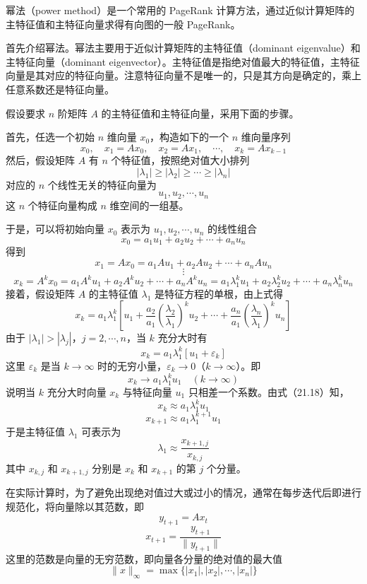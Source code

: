 \documentclass[UTF8,12pt,a4paper,fontset=fandol]{ctexart}
\begin{document}
幂法（power method）是一个常用的 PageRank 计算方法，通过近似计算矩阵的主特征值和主特征向量求得有向图的一般 PageRank。

首先介绍幂法。幂法主要用于近似计算矩阵的主特征值（dominant eigenvalue）和主特征向量（dominant eigenvector）。主特征值是指绝对值最大的特征值，主特征向量是其对应的特征向量。注意特征向量不是唯一的，只是其方向是确定的，乘上任意系数还是特征向量。

假设要求 $n$ 阶矩阵 $A$ 的主特征值和主特征向量，采用下面的步骤。

首先，任选一个初始 $n$ 维向量 $x_0$，构造如下的一个 $n$ 维向量序列
\[
x_0,\quad x_1=Ax_0,\quad x_2=Ax_1,\quad \cdots,\quad x_k=Ax_{k-1}
\]
然后，假设矩阵 $A$ 有 $n$ 个特征值，按照绝对值大小排列
\[
|\lambda_1|\geqslant |\lambda_2|\geqslant \cdots \geqslant |\lambda_n|
\]
对应的 $n$ 个线性无关的特征向量为
\[
u_1,u_2,\cdots,u_n
\]
这 $n$ 个特征向量构成 $n$ 维空间的一组基。

于是，可以将初始向量 $x_0$ 表示为 $u_1,u_2,\cdots,u_n$ 的线性组合
\[
x_0=a_1u_1+a_2u_2+\cdots+a_nu_n
\]
得到
\[
x_1=Ax_0=a_1Au_1+a_2Au_2+\cdots+a_nAu_n
\]
\[
\vdots
\]
\[
x_k=A^kx_0=a_1A^ku_1+a_2A^ku_2+\cdots+a_nA^ku_n
=a_1\lambda_1^ku_1+a_2\lambda_2^ku_2+\cdots+a_n\lambda_n^ku_n
\]
接着，假设矩阵 $A$ 的主特征值 $\lambda_1$ 是特征方程的单根，由上式得
\begin{equation}
x_k=a_1\lambda_1^k\left[u_1+\frac{a_2}{a_1}\left(\frac{\lambda_2}{\lambda_1}\right)^ku_2+\cdots+\frac{a_n}{a_1}\left(\frac{\lambda_n}{\lambda_1}\right)^ku_n\right]
\tag{21.16}
\end{equation}
由于 $|\lambda_1|>|\lambda_j|$，$j=2,\cdots,n$，当 $k$ 充分大时有
\begin{equation}
x_k=a_1\lambda_1^k[u_1+\varepsilon_k]
\tag{21.17}
\end{equation}
这里 $\varepsilon_k$ 是当 $k\to\infty$ 时的无穷小量，$\varepsilon_k\to 0$（$k\to\infty$）。即
\begin{equation}
x_k\to a_1\lambda_1^ku_1\quad (k\to\infty)
\tag{21.18}
\end{equation}
说明当 $k$ 充分大时向量 $x_k$ 与特征向量 $u_1$ 只相差一个系数。由式（21.18）知，
\[
x_k\approx a_1\lambda_1^ku_1
\]
\[
x_{k+1}\approx a_1\lambda_1^{k+1}u_1
\]
于是主特征值 $\lambda_1$ 可表示为
\begin{equation}
\lambda_1\approx \frac{x_{k+1,j}}{x_{k,j}}
\tag{21.19}
\end{equation}
其中 $x_{k,j}$ 和 $x_{k+1,j}$ 分别是 $x_k$ 和 $x_{k+1}$ 的第 $j$ 个分量。

在实际计算时，为了避免出现绝对值过大或过小的情况，通常在每步迭代后即进行规范化，将向量除以其范数，即
\begin{equation}
y_{t+1}=Ax_t
\tag{21.20}
\end{equation}
\begin{equation}
x_{t+1}=\frac{y_{t+1}}{\|y_{t+1}\|}
\tag{21.21}
\end{equation}
这里的范数是向量的无穷范数，即向量各分量的绝对值的最大值
\[
\|x\|_\infty=\max\{|x_1|,|x_2|,\cdots,|x_n|\}
\]
\end{document}
